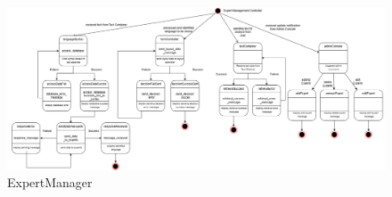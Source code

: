 \begin{figure}[H]
	\centering
	\includegraphics[width=\linewidth]{Section2/Expert_Manager_state_diagram.png}
	\caption{ExpertManager}
	\label{ExpertManager}
\end{figure}